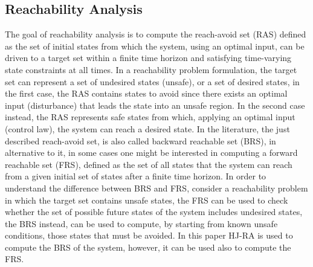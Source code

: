 \subsection{Reachability Analysis}
The goal of reachability analysis is to compute the reach-avoid set (RAS) defined as the set of initial states from which the system, using an optimal input, can be driven to a target set within a finite time horizon and satisfying time-varying state constraints at all times. In a reachability problem formulation, the target set can represent a set of undesired states (unsafe), or a set of desired states, in the first case, the RAS contains states to avoid since there exists an optimal input (disturbance) that leads the state into an unsafe region. In the second case instead, the RAS represents safe states from which, applying an optimal input (control law), the system can reach a desired state. 
In the literature, the just described reach-avoid set, is also called backward reachable set (BRS), in alternative to it, in some cases one might be interested in computing a forward reachable set (FRS), defined as the set of all states that the system can reach from a given initial set of states after a finite time horizon. In order to understand the difference between BRS and FRS, consider a reachability problem in which the target set contains unsafe states, the FRS can be used to check whether the set of possible future states of the system includes undesired states, the BRS instead, can be used to compute, by starting from known unsafe conditions, those states that must be avoided. In this paper HJ-RA is used to compute the BRS of the system, however, it can be used also to compute the FRS. 
